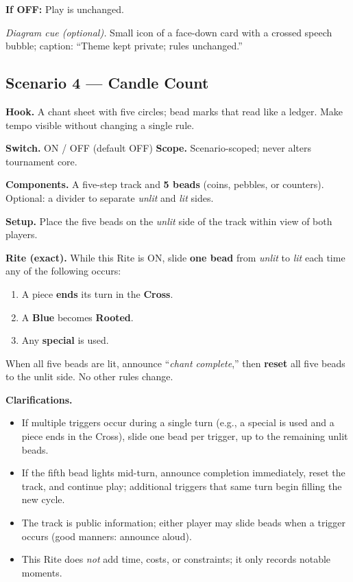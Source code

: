 \documentclass[11pt]{article}
\numberwithin{equation}{section} %
\theoremstyle{plain} %
\theoremstyle{definition} %
\theoremstyle{remark} %
\begin{document}
\medskip
\noindent\textbf{If \textsc{OFF}:} Play is unchanged.

\medskip
\noindent\textit{Diagram cue (optional).} Small icon of a face-down card with a crossed speech bubble; caption: “Theme kept private; rules unchanged.”

\subsection{Scenario 4 — Candle Count}
\label{scen:candle-count}

\noindent\textbf{Hook.} A chant sheet with five circles; bead marks that read like a ledger. Make tempo visible without changing a single rule.

\medskip
\noindent\textbf{Switch.} \textsc{ON / OFF} (default \textsc{OFF}) \hfill \textbf{Scope.} Scenario-scoped; never alters tournament core.

\medskip
\noindent\textbf{Components.} A five-step track and \textbf{5 beads} (coins, pebbles, or counters). Optional: a divider to separate \emph{unlit} and \emph{lit} sides.

\medskip
\noindent\textbf{Setup.} Place the five beads on the \emph{unlit} side of the track within view of both players.

\medskip
\noindent\textbf{Rite (exact).} While this Rite is \textsc{ON}, slide \textbf{one bead} from \emph{unlit} to \emph{lit} each time any of the following occurs:
\begin{enumerate}\setlength\itemsep{0.2em}
  \item A piece \textbf{ends} its turn in the \textbf{Cross}.
  \item A \textbf{Blue} becomes \textbf{Rooted}.
  \item Any \textbf{special} is used.
\end{enumerate}
When all five beads are lit, announce “\textit{chant complete},” then \textbf{reset} all five beads to the unlit side. No other rules change.

\medskip
\noindent\textbf{Clarifications.}
\begin{itemize}\setlength\itemsep{0.25em}
  \item If multiple triggers occur during a single turn (e.g., a special is used and a piece ends in the Cross), slide one bead per trigger, up to the remaining unlit beads.
  \item If the fifth bead lights mid-turn, announce completion immediately, reset the track, and continue play; additional triggers that same turn begin filling the new cycle.
  \item The track is public information; either player may slide beads when a trigger occurs (good manners: announce aloud).
  \item This Rite does \emph{not} add time, costs, or constraints; it only records notable moments.
\end{itemize}
\end{document}
